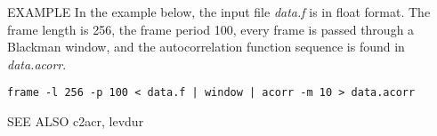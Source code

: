 \begin{options}
\end{options}

\begin{qsection}{EXAMPLE}
In the example below, the input file {\em data.f} is in float format.
The frame length is 256, the frame period 100, every frame is
passed through a Blackman window, and the autocorrelation function sequence
is found in {\em data.acorr}.
\begin{center}
 \verb!frame -l 256 -p 100 < data.f | window | acorr -m 10 > data.acorr!
\end{center}
\end{qsection}

\begin{qsection}{SEE ALSO}
 c2acr, levdur
\end{qsection}
